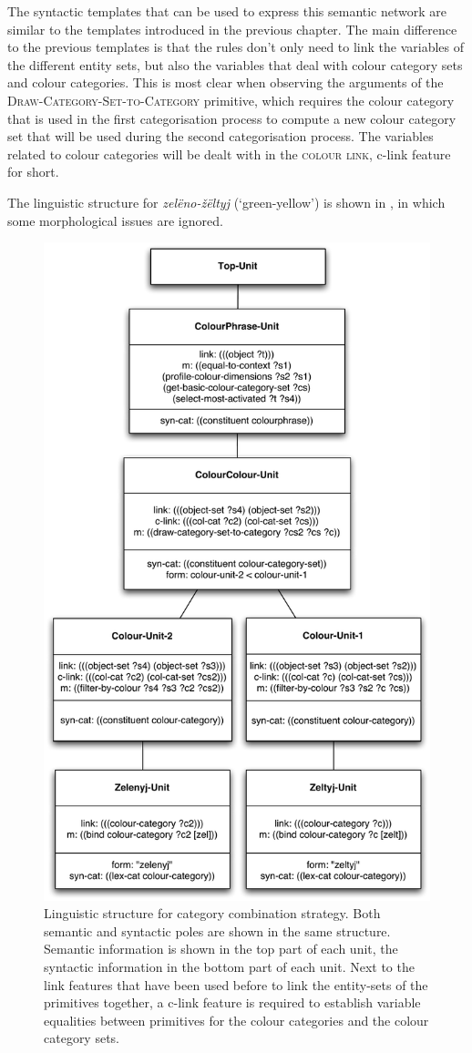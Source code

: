 The syntactic templates that can be used to express this semantic
network are similar to the templates introduced in the previous
chapter. The main difference to the previous templates is that the
rules don't only need to link the variables of the different entity
sets, but also the variables that deal with colour category sets and
colour categories. This is most clear when observing the arguments of
the \textsc{Draw-Category-Set-to-Category} primitive, which requires
the colour category that is used in the first categorisation process
to compute a new colour category set that will be used during the
second categorisation process. The variables related to colour
categories will be dealt with in the \textsc{colour link},
c-link feature for short.

The linguistic structure for \textit{zel\"eno-\v z\"eltyj} (`green-yellow')
is shown in , in which some
morphological issues are ignored.

\begin{figure}[htbp]
  \centering
  \includegraphics[width=.70\textwidth]{./category-combination/figures/linguistic-structure.pdf}
  \caption[Linguistic structure for category combination
  strategy]{Linguistic structure for category combination
    strategy. Both semantic and syntactic poles are shown in the same
    structure. Semantic information is shown in the top part of each
    unit, the syntactic information in the bottom part of each
    unit. Next to the link features that have been used before to link
    the entity-sets of the primitives together, a c-link feature is
    required to establish variable equalities between primitives for
    the colour categories and the colour category sets.}
  \label{f:ccs-linguistic-structure}
\end{figure}

